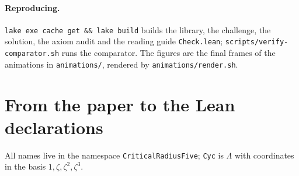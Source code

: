 \documentclass[11pt,a4paper]{article}
\newcommand{\Lam}{\Lambda}
\begin{document}
\paragraph{Reproducing.}
\texttt{lake exe cache get \&\& lake build} builds the library, the challenge, the solution, the
axiom audit and the reading guide \texttt{Check.lean}; \texttt{scripts/verify-comparator.sh} runs
the comparator. The figures are the final
frames of the animations in \texttt{animations/}, rendered by \texttt{animations/render.sh}.

\appendix
\section{From the paper to the Lean declarations}\label{app:lean}

All names live in the namespace \texttt{CriticalRadiusFive}; \texttt{Cyc} is $\Lam$ with
coordinates in the basis $1,\zeta,\zeta^2,\zeta^3$.
\end{document}
